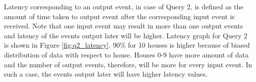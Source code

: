 Latency corresponding to an output event, in case of Query 2, is defined as the amount of time taken to output event after the corresponding input event is received.
Note that one input event may result in more than one output events and latency of the events output later will be higher.
Latency graph for Query 2 is shown in Figure \ref{fig:q2_latency}.
90\% for 10 houses is higher because of biased distribution of data with respect to house.
Houses 0-9 have more amount of data and the number of output events, therefore, will be more for every input event.
In such a case, the events output later will have higher latency values.
